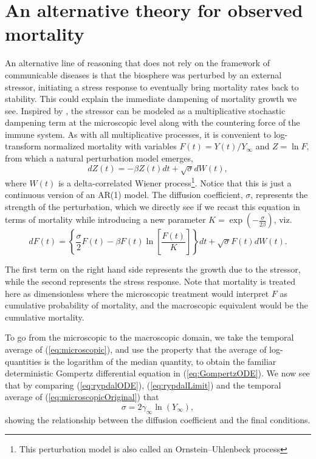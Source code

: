 \documentclass[review]{elsarticle}
\begin{document}
\section{An alternative theory for observed mortality}
An alternative line of reasoning that does not rely on the framework of communicable diseases is that the biosphere was perturbed by an external stressor, initiating a stress response to eventually bring mortality rates back to stability. This could explain the immediate dampening of mortality growth we see. 
Inspired by  \citet{de2014stochastic}, the stressor can be modeled as a multiplicative stochastic dampening term at the microscopic level along with the countering force of the immune system. 
As with all multiplicative processes, it is convenient to log-transform normalized mortality with variables $F(t)=Y(t)/Y_{\infty}$ and $Z=\ln{F}$, from which a natural perturbation model emerges,
\begin{equation}
\label{eq:microscopic}
dZ(t)= -\beta Z(t) dt + \sqrt{\sigma}dW(t),
\end{equation}
where $W(t)$ is a delta-correlated Wiener process\footnote{This perturbation model is also called an Ornstein–Uhlenbeck process}. Notice that this is just a continuous version of an AR(1) model. The diffusion coefficient, $\sigma$, represents the strength of the perturbation, which we directly see if we recast this equation in terms of mortality while introducing a new parameter $K=\exp{(-\frac{\sigma}{2\beta})}$, viz. 
\begin{equation}
\label{eq:microscopicOriginal}
dF(t) = \left\{\frac{\sigma}{2}F(t) - \beta F(t)\ln\left[\frac{F(t)}{K}\right]\right\}dt + \sqrt{\sigma}F(t)dW(t).
\end{equation}

The first term on the right hand side represents the growth due to the stressor, while the second represents the stress response. 
Note that mortality is treated here as dimensionless where the microscopic treatment would interpret $F$ as cumulative probability of mortality, and the macroscopic equivalent would be the cumulative mortality. 

To go from the microscopic to the macroscopic domain, we take the temporal average of (\ref{eq:microscopic}), and use the property that the average of log-quantities is the logarithm of the median quantity, to obtain the familiar deterministic Gompertz differential equation in (\ref{eq:GompertzODE}). We now see that by comparing (\ref{eq:rypdalODE}), (\ref{eq:rypdalLimit}) and the temporal average of (\ref{eq:microscopicOriginal}) that 
\begin{equation}
\sigma = 2\gamma_{\infty}\ln{(Y_{\infty})},
\end{equation}
showing the relationship between the diffusion coefficient and the final conditions. 
\end{document}
